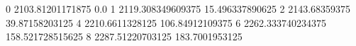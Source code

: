 0 2103.81201171875 0.0
1 2119.308349609375 15.496337890625
2 2143.68359375 39.87158203125
4 2210.6611328125 106.84912109375
6 2262.333740234375 158.521728515625
8 2287.51220703125 183.7001953125

